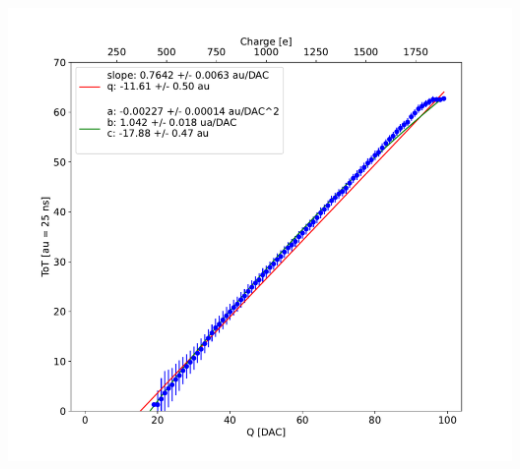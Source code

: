 \begin{frame}
\begin{columns}
            \includegraphics[width=1.2\linewidth]{figures/charaterization/ToT_injection.pdf} 
        \end{columns}
    \end{frame}    

      


